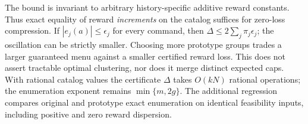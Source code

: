 The bound is invariant to arbitrary history-specific additive reward constants. Thus exact equality of reward \emph{increments} on the catalog suffices for zero-loss compression. If $|e_j(a)|\leq\epsilon_j$ for every command, then $\Delta\leq2\sum_j\pi_j\epsilon_j$; the oscillation can be strictly smaller. Choosing more prototype groups trades a larger guaranteed menu against a smaller certified reward loss. This does not assert tractable optimal clustering, nor does it merge distinct expected caps. With rational catalog values the certificate $\Delta$ takes $O(kN)$ rational operations; the enumeration exponent remains $\min\{m,2g\}$. The additional regression compares original and prototype exact enumeration on identical feasibility inputs, including positive and zero reward dispersion.
